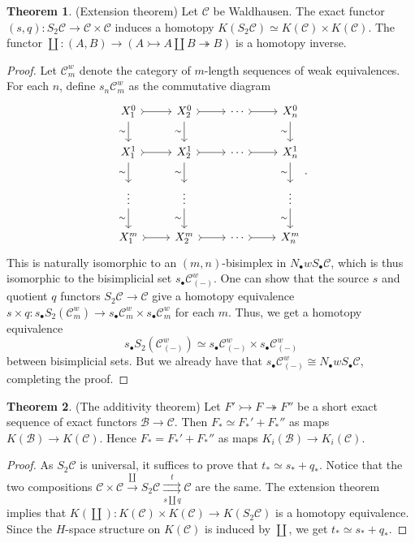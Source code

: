 \documentclass[10pt,letterpaper,cm]{nupset}
\theoremstyle{definition}
\newtheorem{theorem}{Theorem}
\newcommand{\1}{\mathbf{1}}
\renewcommand{\b}{\mathscr{B}}
\renewcommand{\c}{\mathscr{C}}
\newcommand{\0}{\vec 0}
\begin{document}
\begin{theorem}{(Extension theorem)}
Let $\c$ be Waldhausen. The exact functor $(s, q) : S_2 \c \to \c \times \c$ induces  a homotopy $K(S_2\c) \simeq K(\c) \times K(\c)$. The functor $\coprod : (A, B) \to (A \rightarrowtail A \coprod B \twoheadrightarrow  B)$ is a homotopy inverse.
\end{theorem}
\begin{proof}
Let $\c^w_m$ denote the category of $m$-length sequences of weak equivalences. For each $n$, define $s_n\c^w_m$ as the commutative diagram
\[
\begin{tikzcd}
 X_1^0 \arrow[d, "\sim"'] \arrow[r, tail] & X_2^0 \arrow[r, tail] \arrow[d, "\sim"'] & \cdots \arrow[r, tail] & X_n^0 \arrow[d, "\sim"'] \\
X_1^1 \arrow[d, "\sim"'] \arrow[r, tail] & X_2^1 \arrow[r, tail] \arrow[d, "\sim"'] & \cdots \arrow[r, tail] & X_n^1 \arrow[d, "\sim"'] \\
  \vdots \arrow[d, "\sim"'] & \vdots \arrow[d, "\sim"'] &  & \vdots \arrow[d, "\sim"'] \\
 X_1^m \arrow[r, tail] & X_2^m \arrow[r, tail] & \cdots \arrow[r, tail] & X_n^m
\end{tikzcd}
.\]
This is naturally isomorphic to an $(m, n)$-bisimplex in $N_{\bullet}w S_{\bullet}\c$, which is thus isomorphic to the bisimplicial set $s_{\bullet}\c^w_{(-)}$. One can show that the source $s$ and quotient $q$ functors  $S_2 \c \to \c$ give a homotopy equivalence $s \times q : s_{\bullet}S_2(\c^w_m) \to s_{\bullet}\c^w_m \times s_{\bullet}\c^w_m$ for each $m$. Thus, we get a homotopy equivalence  $$s_{\bullet}S_2(\c^w_{(-)}) \simeq s_{\bullet}\c^w_{(-)} \times s_{\bullet}\c^w_{(-)}$$ between bisimplicial sets. But we already have that $s_{\bullet}\c^w_{(-)} \cong N_{\bullet}w S_{\bullet}\c$, completing the proof.
\end{proof}

\begin{theorem}{(The additivity theorem)}
Let $F' \rightarrowtail F \twoheadrightarrow F''$ be a short exact sequence of exact functors $\b \to \c$. Then $F_{\ast} \simeq F_{\ast}' + F_{\ast}''$ as maps $K(\b) \to K(\c)$. Hence $F_{\ast} = F_{\ast}' + F_{\ast}''$ as maps $K_i(\b) \to K_i(\c)$. 
\end{theorem}
\begin{proof}
As $S_2\c$ is universal, it suffices to prove that $t_{\ast}  \simeq s_{\ast} + q_{\ast}$. Notice that the two compositions $\c \times \c \overset{\coprod}{\longrightarrow} S_2 \c  \underset{s \coprod q}{\overset{t}{\rightrightarrows}} \c$ are the same. The extension theorem implies that $K(\coprod): K(\c) \times K(\c) \to K(S_2 \c)$ is a homotopy equivalence. Since the $H$-space structure on $K(\c)$ is induced by $\coprod$, we get $t_{\ast}  \simeq s_{\ast} + q_{\ast}$. 
\end{proof}
\end{document}
